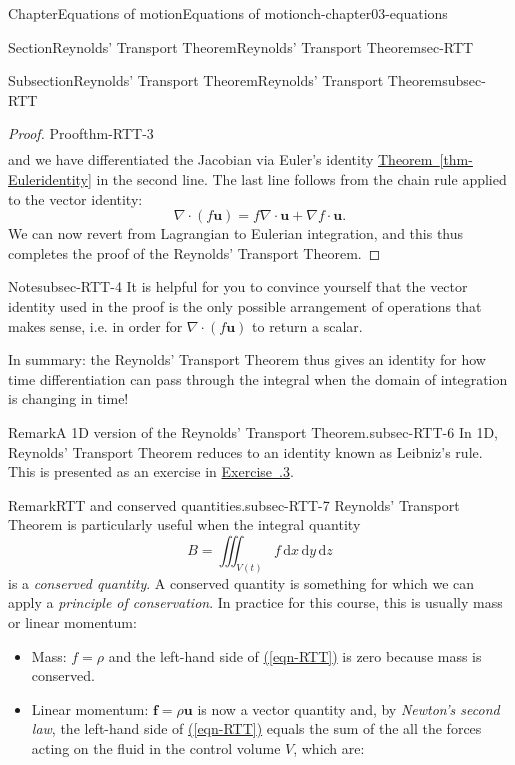 \documentclass[oneside,10pt,]{book}
\newcommand{\xreffont}{\relax}
\numberwithin{equation}{section}
\newcommand{\de}{\mathrm{d}}
\newcommand{\bu}{\boldsymbol{u}}
\renewcommand{\bf}{\boldsymbol{f}}
\begin{document}
\begin{chapterptx}{Chapter}{Equations of motion}{}{Equations of motion}{}{}{ch-chapter03-equations}
\begin{sectionptx}{Section}{Reynolds' Transport Theorem}{}{Reynolds' Transport Theorem}{}{}{sec-RTT}
\begin{subsectionptx}{Subsection}{Reynolds' Transport Theorem}{}{Reynolds' Transport Theorem}{}{}{subsec-RTT}
\begin{proof}{Proof}{}{thm-RTT-3}
\begin{align*}
\end{align*}
and we have differentiated the Jacobian via Euler's identity \hyperref[thm-Euleridentity]{Theorem~{\xreffont\ref{thm-Euleridentity}}} in the second line. The last line follows from the chain rule applied to the vector identity:%
\begin{equation*}
\nabla \cdot (f\bu) = f \nabla \cdot \bu + \nabla f \cdot \bu.
\end{equation*}
We can now revert from Lagrangian to Eulerian integration, and this thus completes the proof of the Reynolds' Transport Theorem.%
\end{proof}
\begin{note}{Note}{}{subsec-RTT-4}%
It is helpful for you to convince yourself that the vector identity used in the proof is the only possible arrangement of operations that makes sense, i.e. in order for \(\nabla \cdot
(f\bu)\) to return a scalar.%
\end{note}
In summary: the Reynolds' Transport Theorem thus gives an identity for how time differentiation can pass through the integral when the domain of integration is changing in time!%
\begin{remark}{Remark}{A 1D version of the Reynolds' Transport Theorem.}{subsec-RTT-6}%
In 1D, Reynolds' Transport Theorem reduces to an identity known as Leibniz's rule. This is presented as an exercise in \hyperlink{ex-leibnitz-rule}{Exercise~{\xreffont 3.6.3}}.%
\end{remark}
\begin{remark}{Remark}{RTT and conserved quantities.}{subsec-RTT-7}%
Reynolds' Transport Theorem is particularly useful when the integral quantity%
\begin{equation*}
B = \iiint_{V(t)} f \, \de{x} \, \de{y} \, \de{z}
\end{equation*}
is a \emph{conserved quantity}. A conserved quantity is something for which we can apply a \emph{principle of conservation}. In practice for this course, this is usually mass or linear momentum:%
\begin{itemize}[label=\textbullet]
\item{}Mass: \(f=\rho\) and the left-hand side of \hyperref[eqn-RTT]{({\xreffont\ref{eqn-RTT}})} is zero because mass is conserved.%
\item{}Linear momentum: \(\bf=\rho\bu\) is now a vector quantity and, by \emph{Newton's second law}, the left-hand side of \hyperref[eqn-RTT]{({\xreffont\ref{eqn-RTT}})} equals the sum of the all the forces acting on the fluid in the control volume \(V\), which are:%

\end{itemize}
\end{remark}
\end{subsectionptx}
\end{sectionptx}
\end{chapterptx}
\end{document}
